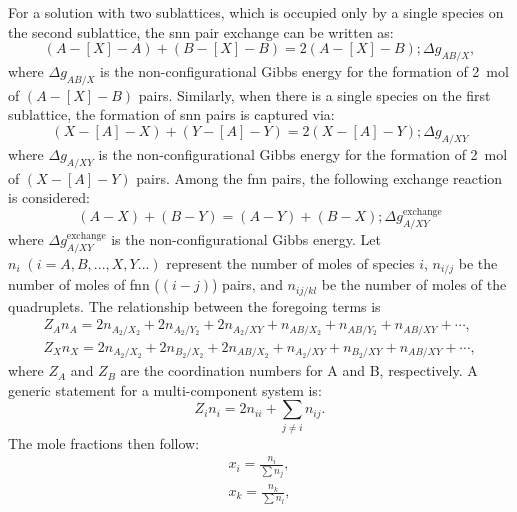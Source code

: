 \begin{enumerate}
        For a solution with two sublattices, which is occupied only by a single species on the second sublattice, the \gls{snn} pair exchange can be written as:
            \begin{equation} \label{SNNPairExchange1}
	            (A-[X]-A) + (B-[X]-B) = 2(A-[X]-B); \Delta g_{AB/X},
            \end{equation}
        where $\Delta g_{AB/X}$ is the non-configurational Gibbs energy for the formation of \SI{2}{\mole} of $(A-[X]-B)$ pairs. Similarly, when there is a single species on the first sublattice, the formation of \gls{snn} pairs is captured via:
            \begin{equation} \label{SNNPairExchange2}
	            (X-[A]-X) + (Y-[A]-Y) = 2(X-[A]-Y); \Delta g_{A/XY}
            \end{equation}
        where $\Delta g_{A/XY}$ is the non-configurational Gibbs energy for the formation of \SI{2}{\mole} of $(X-[A]-Y)$ pairs.
        Among the \gls{fnn} pairs, the following exchange reaction is considered:
            \begin{equation} \label{FNNPairExchange}
	            (A-X) + (B-Y) = (A-Y) + (B-X); \Delta g_{A/XY}^\text{exchange}
            \end{equation}
        where $\Delta g_{A/XY}^\text{exchange}$ is the non-configurational Gibbs energy.
        Let $n_i \; (i=A,B,...,X,Y...)$ represent the number of moles of species $i$, $n_{i/j}$ be the number of moles of \gls{fnn} ($(i - j)$) pairs, and $n_{ij/kl}$ be the number of moles of the quadruplets. The relationship between the foregoing terms is \cite{Pelton01b}
        \begin{gather}\label{EqMassBalance1}
	       Z_A n_A  = 2n_{A_2/X_2} + 2n_{A_2/Y_2} + 2n_{A_2/XY} + n_{AB/X_2} + n_{AB/Y_2} + n_{AB/XY} + \cdots, \\
	       Z_X n_X  = 2n_{A_2/X_2} + 2n_{B_2/X_2} + 2n_{AB/X_2} + n_{A_2/XY} + n_{B_2/XY} + n_{AB/XY} + \cdots,
        \end{gather}
        where $Z_A$ and $Z_B$ are the coordination numbers for A and B, respectively. A generic statement for a multi-component system is:
  	\begin{equation}
		Z_i n_i = 2n_{ii} + \sum_{j \ne i} n_{ij}.
         \end{equation}
        The mole fractions then follow:
        \begin{gather} \label{EqMoleFraction}
            x_{i} = \frac{n_{i}}{\sum n_j}, \\
            x_{k} = \frac{n_{k}}{\sum n_l},

\end{gather}
\end{enumerate}
